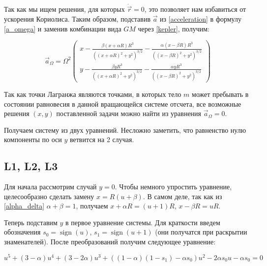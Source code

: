 \documentclass[12pt]{article}
\DeclareMathOperator{\sign}{sign}
\begin{document}
    Так как мы ищем решения, для которых $\dot{\vec{r}} = 0$, это
    позволяет нам избавиться от ускорения Кориолиса. Таким образом, подставив 
    $\vec{a}$ из \ref{acceleration} в формулу \ref{a_omega} и заменив
    комбинации вида $GM$ через \ref{kepler}, получим:

    \begin{equation}
        \vec{a}_{\Omega} = \Omega^2
        \begin{pmatrix}
            x - \frac{\beta (x + \alpha R)R^3}{((x + \alpha R)^2 + y^2)^{3/2}} - 
            \frac{\alpha (x - \beta R)R^3}{((x - \beta R)^2 + y^2)^{3/2}} \\
            y - \frac{\beta y R^3}{((x + \alpha R)^2 + y^2)^{3/2}} - 
            \frac{\alpha y R^3}{((x - \beta R)^2 + y^2)^{3/2}}
        \end{pmatrix}
        \label{main}
    \end{equation}

    \par Так как точки Лагранжа являются точками, в которых тело $m$ может пребывать в 
    состоянии равновесия в данной вращающейся системе отсчета, все возможные решения
    $(x,y)$ поставленной задачи можно найти из уравнения $\vec{a}_{\Omega} = 0$.

    \par Получаем систему из двух уравнений. Несложно заметить, что равненство
    нулю компоненты по оси $y$ ветвится на 2 случая. 
    
    \subsection{L1, L2, L3}
    Для начала рассмотрим 
    случай $y = 0$. Чтобы немного упростить уравнение, 
    целесообразно сделать замену $x = R(u + \beta)$. В самом деле, так как
    из \ref{alpha_delta} $\alpha + \beta = 1$, получаем $x + \alpha R = (u + 1)R$,
    $x - \beta R = uR$. 
    
    \par Теперь подставим $y$ в первое уравнение системы. Для краткости
    введем обозначения $s_0 = \sign(u)$, $s_1 = \sign(u + 1)$ (они получатся
    при раскрытии знаменателей). После преобразований получим следующее уравнение:

    \begin{equation}
        u^5 + (3 - \alpha)u^4 + (3 - 2\alpha)u^3 + ((1-\alpha)(1 - s_1) - 
        \alpha s_0)u^2 - 2\alpha s_0 u - \alpha s_0 = 0
        \label{fifth}
    \end{equation}
\end{document}
